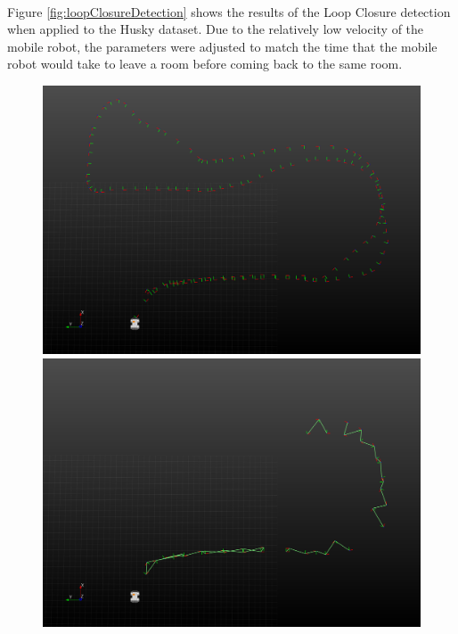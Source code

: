 \documentclass[12pt]{article}
\begin{document}
	\paragraph{}
	Figure \ref{fig:loopClosureDetection} shows the results of the Loop Closure detection when applied to the Husky dataset. Due to the relatively low velocity of the mobile robot, the parameters were adjusted to match the time that the mobile robot would take to leave a room before coming back to the same room.
	\begin{figure}
	\begin{minipage}{0.67\textwidth}
				\centering
				\includegraphics[width=\textwidth]{LoopClosureTimeSampling}
				\includegraphics[width=\textwidth]{LoopClosureEuclideanSampling}

\end{minipage}
\end{figure}
\end{document}
